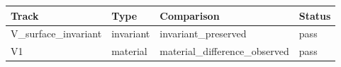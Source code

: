\begin{tabular}{llll}
\toprule
Track & Type & Comparison & Status \\
\midrule
V\_surface\_invariant & invariant & invariant\_preserved & pass \\
V1 & material & material\_difference\_observed & pass \\
\bottomrule
\end{tabular}
